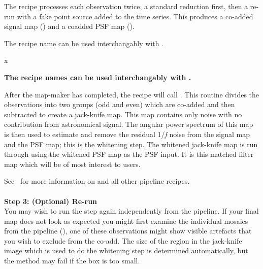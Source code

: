 \documentclass[11pt,oneside,chapters]{starlink}
\begin{document}
The recipe processes each observation twice, a standard reduction
first, then a re-run with a fake point source added to the time
series. This produces a co-added signal map () and a
coadded PSF map ().

\begin{tip}
The recipe name  can be used
interchangably with  .
\end{tip}x

\begin{htmlonly}
\textbf{The recipe names  can be
used interchangably with  .}
\end{htmlonly}

After the map-maker has completed, the recipe will call
. This
routine divides the observations into two groups (odd and even) which
are co-added and then subtracted to create a jack-knife map. This map
contains only noise with no contribution from astronomical signal. The
angular power spectrum of this map is then used to estimate and remove
the residual 1/\emph{f} noise from the signal map and the PSF map;
this is the whitening step. The whitened jack-knife map is run through
using the whitened PSF map as the PSF input. It is this matched filter
map which will be of most interest to users.

See \pipelinesun\ for more information on
 and all other pipeline
recipes.
\\ \\
\textbf{Step 3: (Optional) Re-run }\\
You may wish to run the  step again
independently from the pipeline. If your final map does not look as
expected you might first examine the individual mosaics from the
pipeline (), one of these observations might show visible
artefacts that you wish to exclude from the co-add. The size of the
region in the jack-knife image which is used to do the whitening step
is determined automatically, but the method may fail if the box is too
small.
\end{document}
